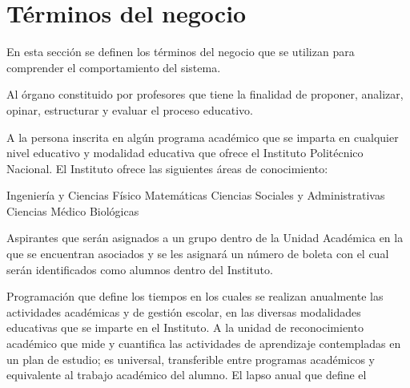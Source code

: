 \section{Términos del negocio}

En esta sección se definen los términos del negocio que se utilizan para comprender el comportamiento del sistema.

\begin{bGlosario}	
	
	 Al órgano constituido por profesores que tiene la finalidad de proponer, analizar, opinar, estructurar y evaluar el proceso educativo.
	
	 A la persona inscrita en algún programa académico que se imparta en cualquier nivel educativo y modalidad educativa que ofrece el Instituto Politécnico Nacional. %
	 El Instituto ofrece las siguientes áreas de conocimiento:
	\begin{Titemize}
		\Titem Ingeniería y Ciencias Físico Matemáticas
		\Titem Ciencias Sociales y Administrativas
		\Titem Ciencias Médico Biológicas
	\end{Titemize}

		Aspirantes que serán asignados a un grupo dentro de la Unidad Académica en la que se encuentran asociados y se les asignará un número de boleta con el cual serán identificados como alumnos dentro del Instituto.

 	 Programación que define los tiempos en los cuales se realizan anualmente las actividades académicas y de gestión escolar, en las diversas modalidades educativas que se imparte en el Instituto.
	  A la unidad de reconocimiento académico que mide y cuantifica las actividades de aprendizaje contempladas en un plan de estudio; es universal, transferible entre programas académicos y equivalente al trabajo académico del alumno.
	  El lapso anual que define el 


\end{bGlosario}
